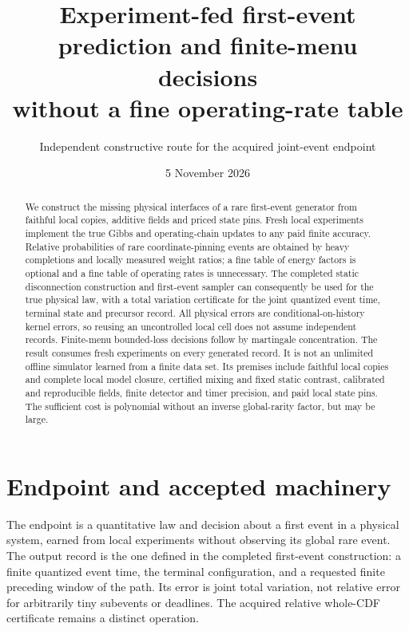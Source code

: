 \documentclass[11pt]{article}
\title{Experiment-fed first-event prediction and finite-menu decisions\\
without a fine operating-rate table}
\author{Independent constructive route for the acquired joint-event endpoint}
\date{5 November 2026}
\begin{document}
\maketitle
\begin{abstract}
We construct the missing physical interfaces of a rare first-event generator
from faithful local copies, additive fields and priced state pins. Fresh local
experiments implement the true Gibbs and operating-chain updates to any paid
finite accuracy. Relative probabilities of rare coordinate-pinning events are
obtained by heavy completions and locally measured weight ratios; a fine table
of energy factors is optional and a fine table of operating rates is
unnecessary. The completed static disconnection construction and first-event
sampler can consequently be used for the true physical law, with a total
variation certificate for the joint quantized event time, terminal state and
precursor record. All physical errors are conditional-on-history kernel errors,
so reusing an uncontrolled local cell does not assume independent records.
Finite-menu bounded-loss decisions follow by martingale concentration.
The result consumes fresh experiments on every generated record. It is not an
unlimited offline simulator learned from a finite data set. Its premises include
faithful local copies and complete local model closure, certified mixing and
fixed static contrast, calibrated and reproducible fields, finite detector and
timer precision, and paid local state pins. The sufficient cost is polynomial
without an inverse global-rarity factor, but may be large.
\end{abstract}

\section{Endpoint and accepted machinery}

The endpoint is a quantitative law and decision about a first event in a
physical system, earned from local experiments without observing its global
rare event. The output record is the one defined in the completed first-event
construction: a finite quantized event time, the terminal configuration, and a
requested finite preceding window of the path. Its error is joint total
variation, not relative error for arbitrarily tiny subevents or deadlines.
The acquired relative whole-CDF certificate remains a distinct operation.
\end{document}
